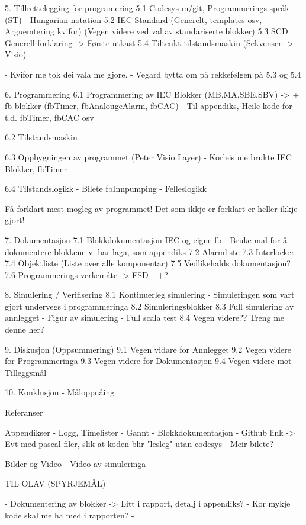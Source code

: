 5. Tillrettelegging for programering
    5.1 Codesys m/git, Programmerings språk (ST) - Hungarian notation
    5.2 IEC Standard (Generelt, templates osv, Arguemtering kvifor) (Vegen videre ved val av standariserte blokker)
    5.3 SCD Generell forklaring -> Første utkast
    5.4 Tiltenkt tilstandsmaskin (Sekvenser -> Visio)
  
    - Kvifor me tok dei vala me gjore.
    - Vegard bytta om på rekkefølgen på 5.3 og 5.4


6. Programmering
    6.1 Programmering av IEC Blokker (MB,MA,SBE,SBV) -> + fb blokker (fbTimer, fbAnalougeAlarm, fbCAC)
    - Til appendiks, Heile kode for t.d. fbTimer, fbCAC osv
   
    6.2 Tilstandsmaskin

    6.3 Oppbygningen av programmet (Peter Visio Layer)
    - Korleis me brukte IEC Blokker, fbTimer

    6.4 Tilstandslogikk
    - Bilete fbInnpumping
    - Felleslogikk

    Få forklart mest mogleg av programmet!
    Det som ikkje er forklart er heller ikkje gjort!

7. Dokumentasjon
    7.1 Blokkdokumentasjon IEC og eigne fb
    - Bruke mal for å dokumentere blokkene vi har laga, som appendiks
    7.2 Alarmliste
    7.3 Interlocker
    7.4 Objektliste (Liste over alle komponentar)
    7.5 Vedlikehalds dokumentasjon? 
    7.6 Programmerings verkemåte -> FSD
    ++?


8. Simulering / Verifisering
    8.1 Kontinuerleg simulering
    - Simuleringen som vart gjort undervegs i programmeringa
    8.2 Simuleringsblokker
    8.3 Full simulering av annlegget
    - Figur av simulering
    - Full scala test
    8.4 Vegen videre?? Treng me denne her?

9. Diskusjon (Oppsummering)
    9.1 Vegen vidare for Annlegget
    9.2 Vegen videre for Programmeringa
    9.3 Vegen videre for Dokumentasjon
    9.4 Vegen videre mot Tilleggsmål

10. Konklusjon 
    - Måloppnåing


Referanser

Appendikser
- Logg, Timelister
- Gannt
- Blokkdokumentasjon
- Github link -> Evt med pascal filer, slik at koden blir "lesleg" utan codesys
- Meir bilete?

Bilder og Video
- Video av simuleringa



TIL OLAV (SPYRJEMÅL)

- Dokumentering av blokker -> Litt i rapport, detalj i appendiks?
- Kor mykje kode skal me ha med i rapporten?
- 

